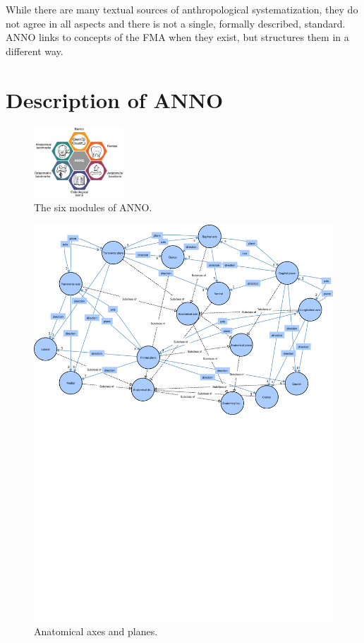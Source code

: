 \documentclass[sw]{iosart2x}
\begin{document}
While there are many textual sources of anthropological systematization, they do not agree in all aspects and there is not a single, formally described, standard.
ANNO links to concepts of the FMA when they exist, but structures them in a different way.

\section{Description of ANNO}

\begin{figure}[h]
\includegraphics[width=0.3\textwidth]{img/modules.pdf}
\caption{The six modules of ANNO.}\label{fig:modules}
\end{figure}

\begin{figure}[h]
\includegraphics[width=\textwidth]{img/axisplane.pdf}
\caption{Anatomical axes and planes.}\label{fig:axisplane}
\end{figure}
\end{document}
